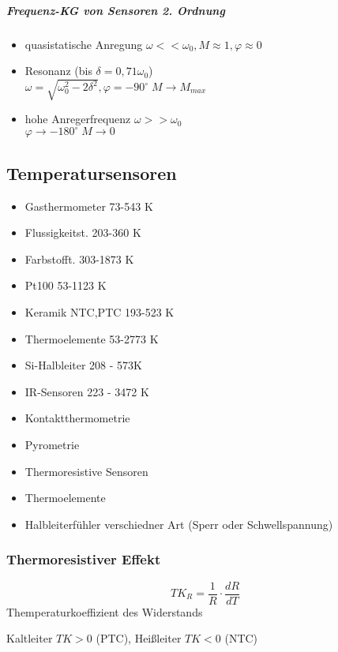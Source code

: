 \documentclass[a4paper]{scrartcl}
\begin{document}
\subparagraph{Frequenz-KG von Sensoren 2. Ordnung}
\begin{itemize}
\item quasistatische Anregung $\omega << \omega_0, M \approx 1, \varphi \approx 0$
\item Resonanz (bis $\delta = 0,71 \omega_0$)\\
$\omega = \sqrt{\omega_0^2 - 2\delta^2}, \varphi = -90^\circ \; M \to M_{max}$

\item hohe Anregerfrequenz $\omega >> \omega_0$\\
$\varphi \to - 180^\circ \; M \to 0$
\end{itemize}


\subsection{Temperatursensoren}
\begin{itemize}
\item Gasthermometer 73-543 K
\item Flussigkeitst. 203-360 K
\item Farbstofft. 303-1873 K
\item Pt100 53-1123 K
\item Keramik NTC,PTC 193-523 K
\item Thermoelemente 53-2773 K
\item Si-Halbleiter 208 - 573K
\item IR-Sensoren 223 - 3472 K
\end{itemize}

\begin{itemize}
\item Kontaktthermometrie
\item Pyrometrie
\item Thermoresistive Sensoren
\item Thermoelemente
\item Halbleiterfühler verschiedner Art (Sperr oder Schwellspannung)
\end{itemize}

\subsubsection{Thermoresistiver Effekt}
\[ TK_R = \frac{1}{R} \cdot \frac{dR}{dT} \]
Themperaturkoeffizient des Widerstands

Kaltleiter $TK > 0$ (PTC), Heißleiter $TK<0$ (NTC)
\end{document}
